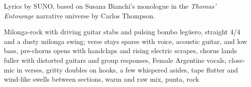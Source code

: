
\begin{notes}
Lyrics by SUNO, based on Susana Bianchi's monologue in the \emph{Thomas’ Entourage} narrative universe by Carlos Thompson.
\end{notes}
\begin{style}
Milonga-rock with driving guitar stabs and pulsing bombo legüero, straight 4/4 and a dusty milonga swing; verse stays sparse with voice, acoustic guitar, and low bass, pre-chorus opens with handclaps and rising electric scrapes, chorus lands fuller with distorted guitars and group responses, Female Argentine vocals, close-mic in verses, gritty doubles on hooks, a few whispered asides, tape flutter and wind-like swells between sections, warm and raw mix, punta, rock
\end{style}
